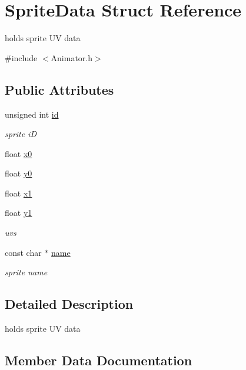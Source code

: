 \hypertarget{struct_sprite_data}{}\section{Sprite\+Data Struct Reference}
\label{struct_sprite_data}


holds sprite U\+V data  




{\ttfamily \#include $<$Animator.\+h$>$}

\subsection*{Public Attributes}
\begin{DoxyCompactItemize}
\item 
unsigned int \hyperlink{struct_sprite_data_a0e22de2e782f60b1ffb5697cf72824cd}{id}
\begin{DoxyCompactList}\small\item\em sprite i\+D \end{DoxyCompactList}\item 
float \hyperlink{struct_sprite_data_a726087f7ea88f2cd8c0841e2c3923628}{x0}
\item 
float \hyperlink{struct_sprite_data_a8c06fce0212a7a8358d59670cf77210b}{y0}
\item 
float \hyperlink{struct_sprite_data_a0dda77ba2d31603e1a71c9b76c5db221}{x1}
\item 
float \hyperlink{struct_sprite_data_a90665db5ae717daab6bcb2726f3fab50}{y1}
\begin{DoxyCompactList}\small\item\em uvs \end{DoxyCompactList}\item 
const char $\ast$ \hyperlink{struct_sprite_data_a942d4fe5b3d2cb84315282ad34e3f64f}{name}
\begin{DoxyCompactList}\small\item\em sprite name \end{DoxyCompactList}\end{DoxyCompactItemize}


\subsection{Detailed Description}
holds sprite U\+V data 

\subsection{Member Data Documentation}
\hypertarget{struct_sprite_data_a0e22de2e782f60b1ffb5697cf72824cd}{}
